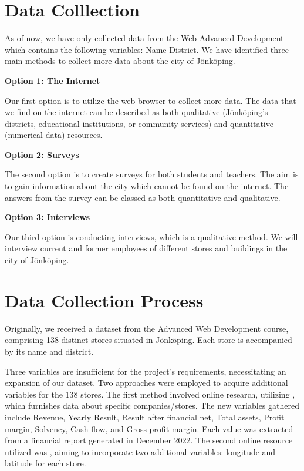 \section{Data Colllection} \label{sec:DataCollection}

As of now, we have only collected data from the Web Advanced Development which contains the following variables: Name District. We have identified three main methods to collect more data about the city of Jönköping.

\textbf{Option 1: The Internet }


Our first option is to utilize the web browser to collect more data. The data that we find on the internet can be described as both qualitative (Jönköping's districts, educational institutions, or community services) and quantitative (numerical data) resources.


\textbf{Option 2: Surveys}


The second option is to create surveys for both students and teachers. The aim is to gain information about the city which cannot be found on the internet. The answers from the survey can be classed as both quantitative and qualitative. 

\textbf{Option 3: Interviews}


Our third option is conducting interviews, which is a qualitative method. We will interview current and former employees of different stores and buildings in the city of Jönköping.
 
\section{Data Collection Process}

Originally, we received a dataset from the Advanced Web Development course, comprising 138 distinct stores situated in Jönköping. Each store is accompanied by its name and district.

Three variables are insufficient for the project's requirements, necessitating an expansion of our dataset. Two approaches were employed to acquire additional variables for the 138 stores. The first method involved online research, utilizing \cite{NotavailableAllaBolag}, which furnishes data about specific companies/stores. The new variables gathered include Revenue, Yearly Result, Result after financial net, Total assets, Profit margin, Solvency, Cash flow, and Gross profit margin. Each value was extracted from a financial report generated in December 2022. The second online resource utilized was \cite{NotavailableGoogleMaps}, aiming to incorporate two additional variables: longitude and latitude for each store. 

